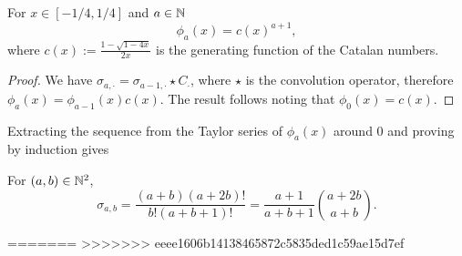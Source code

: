  \begin{myprop}
 	For $x\in [-1/4,1/4]$ and $a\in \mathbb{N}$ 
 	$$\phi_a(x)=c(x)^{a+1},$$
 	where $c(x):=\frac{1-\sqrt{1-4x}}{2x}$ is the generating function of the Catalan numbers.
 \end{myprop}
 \begin{proof}
 	We have $\sigma_{a,\cdot}=\sigma_{a-1,\cdot}\star C_\cdot$, where $\star$ is the convolution operator, therefore $\phi_a(x)=\phi_{a-1}(x)c(x)$. The result follows noting that $\phi_0(x)=c(x)$.
 \end{proof}
 
Extracting the sequence from the Taylor series of $\phi_a(x)$ around 0 and proving by induction gives
 \begin{myprop}
 	For $(a,b)\in\mathbb{N}^2$,
 	$$\sigma_{a,b}=\frac{(a+b)(a+2b)!}{b!(a+b+1)!}=\frac{a+1}{a+b+1}{a+2b\choose a+b}.$$
 \end{myprop}

=======
>>>>>>> eeee1606b14138465872c5835ded1c59ae15d7ef
